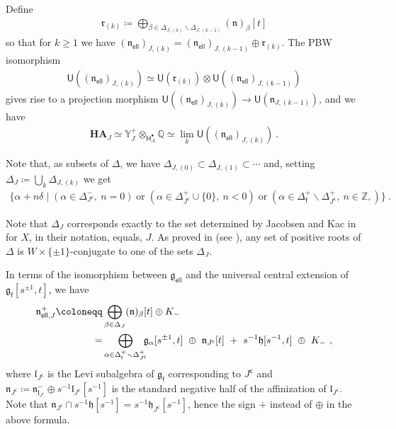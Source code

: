 \documentclass[reqno,a4paper]{amsart}
\newcommand{\Q}{\mathbb{Q}}
\newcommand{\Y}{\mathbb{Y}}
\newcommand{\Z}{\mathbb{Z}}
\newcommand{\sfH}{\mathsf{H}}
\newcommand{\sfU}{\mathsf{U}}
\newcommand{\sff}{\mathsf{f}}
\newcommand{\frakg}{\mathfrak{g}}
\newcommand{\frakh}{\mathfrak{h}}
\newcommand{\frakn}{\mathfrak{n}}
\newcommand{\frakr}{\mathfrak{r}}
\newcommand{\frakgfin}{\frakg_\sff}
\newcommand{\rsv}{X}
\newcommand{\Jcomp}{{J^\mathsf{c}}}
\newcommand{\frakgell}{\mathfrak{g}_{\mathsf{ell}}}
\newcommand{\fraknell}{\mathfrak{n}_{\mathsf{ell}}}
\newcommand{\fraknellJ}{\mathfrak{n}_{\mathsf{ell}, J}}
\newcommand{\coha}{\mathbf{HA}}
\theoremstyle{basic-theorem}
\numberwithin{equation}{section}
\begin{document}
Define
\begin{align}
	\frakr_{(k)}\coloneqq\bigoplus_{\beta \in \Delta_{J, (k)} \smallsetminus \Delta_{J, (k-1)}} (\frakn)_{\beta}[t]
\end{align}
so that for $k \geq 1$ we have $(\fraknell)_{J,(k)}=(\fraknell)_{J,(k-1)} \oplus \frakr_{(k)}$. The PBW isomorphism
\begin{align}
	\sfU((\fraknell)_{J,(k)}) \simeq  \sfU(\frakr_{(k)})\otimes \sfU((\fraknell)_{J,(k-1)})
\end{align}
gives rise to a projection morphism $\sfU((\fraknell)_{J,(k)}) \to \sfU(\frakn_{J,(k-1)})$, and we have
\begin{align}
	\coha_J \simeq \Y_J^+\otimes_{\sfH^\bullet_A} \Q\simeq \lim_k \sfU((\fraknell)_{J,(k)})\ .
\end{align}

Note that, as subsets of $\Delta$, we have $\Delta_{J,(0)} \subset \Delta_{J,(1)} \subset \cdots$ and, setting $\Delta_J\coloneqq\bigcup_k \Delta_{J,(k)}$ we get
\begin{multline}
	\Big\{\alpha +n\delta \; \Big\vert\; (\alpha\in \Delta^-_{\Jcomp},\ n=0) \;\text{or}\;(\alpha\in \Delta^+_{\Jcomp}\cup \{0\},\ n<0)\;\text{or}\;(\alpha\in \Delta^+_\sff \smallsetminus \Delta^+_{\Jcomp},\  n\in \Z, )\Big\} \ .
\end{multline}

\begin{remark}
	Note that $\Delta_J$ corresponds exactly to the set determined by Jacobsen and Kac in \cite[Formula(1.5)]{Jakobsen-Kac-Borel-II} for $\rsv$, in their notation, equals, $J$. As proved in \cite{Jakobsen-Kac-Borel} (see \cite[Proposition~1.7]{Jakobsen-Kac-Borel-II}), any set of positive roots of $\Delta$ is $W\times \{\pm 1\}$-conjugate to one of the sets $\Delta_J$.
\end{remark}

In terms of the isomorphism between $\frakgell$ and the universal central extension of $\frakgfin[s^{\pm 1}, t]$, we have
\begin{align}\label{eq:Ln'}
	\fraknellJ^+\coloneqq& \bigoplus_{\beta \in \Delta_{J}} (\frakn)_\beta[t] \oplus K_-\\
	=& \bigoplus_{\alpha \in \Delta^+_\sff \smallsetminus \Delta^+_{\Jcomp}}\hspace{-5pt}\frakg_{\alpha}[s^{\pm 1},t] \ \oplus\   \frakn_{\Jcomp}[t] \ +\  s^{-1}\frakh[s^{-1},t]\  \oplus \ K_-\ ,
\end{align}
where $\mathfrak{l}_{\Jcomp}$ is the Levi subalgebra of $\frakgfin$ corresponding to $\Jcomp$ and $\frakn_{\Jcomp}\coloneqq\frakn_{\mathfrak{l}_{\Jcomp}}^- \oplus s^{-1} \mathfrak{l}_{\Jcomp}[s^{-1}]$ is the standard negative half of the affinization of $\mathfrak{l}_{\Jcomp}$.
Note that $ \frakn_{\Jcomp} \cap s^{-1}\frakh[s^{-1}] = s^{-1}\frakh_{\Jcomp}[s^{-1}]$, hence the sign $+$ instead of $\oplus$ in the above formula.
\end{document}
